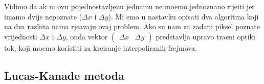 Vidimo da \ch ak ni ovu pojednostavljenu jedna\ch inu ne mo\zh emo jednozna\ch no rije\sh iti jer imamo dvije nepoznate ($\Delta x$ i $\Delta y$). Mi \cj emo u nastavku opisati dva algoritma koji
na dva razli\ch ita na\ch ina rje\sh avaju ovaj problem. Ako su nam za zadani piksel poznate vrijednosti $\Delta x$ i $\Delta y$, onda vektor $(\begin{smallmatrix}\Delta x &\Delta y\end{smallmatrix})$ predstavlja upravo tra\zh eni opti\ch ki tok,
koji mo\zh emo koristiti za kreiranje interpoliranih frejmova.

\subsection{Lucas-Kanade metoda}
